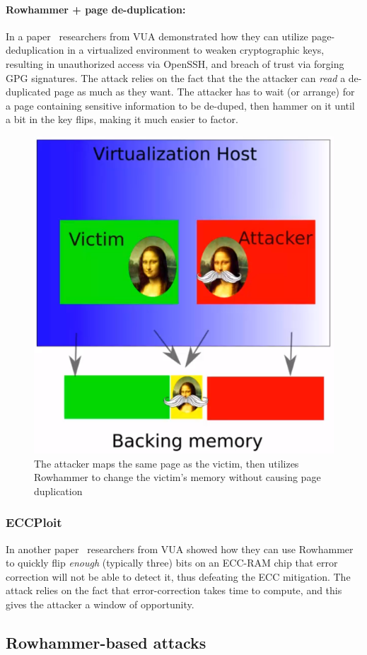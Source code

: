 \paragraph{Rowhammer + page de-duplication:}
In a paper~\cite{ffs} researchers from VUA demonstrated how they can utilize
page-deduplication in a virtualized environment to weaken cryptographic keys,
resulting in unauthorized access via OpenSSH, and breach of trust via forging
GPG signatures. The attack relies on the fact that the the attacker can
\emph{read} a de-duplicated page as much as they want. The attacker has to wait
(or arrange) for a page containing sensitive information to be de-duped, then
hammer on it until a bit in the key flips, making it much easier to factor.
\begin{figure}[!ht]
	\centering
	\includegraphics[width=0.5\linewidth]{images/chapter_9/flip_feng_shui.PNG}
	\caption{The attacker maps the same page as the victim, then utilizes Rowhammer to change the victim's memory without causing page duplication}
	\label{fig:flip_feng_shui}
\end{figure}

\subsubsection{ECCPloit}\label{subsubsec:eccploit}
In another paper~\cite{eccploit} researchers from VUA showed how they can use
Rowhammer to quickly flip \emph{enough} (typically three) bits on an ECC-RAM
chip that error correction will not be able to detect it, thus defeating the ECC
mitigation. The attack relies on the fact that error-correction takes time to
compute, and this gives the attacker a window of opportunity.

\subsection{Rowhammer-based attacks}
